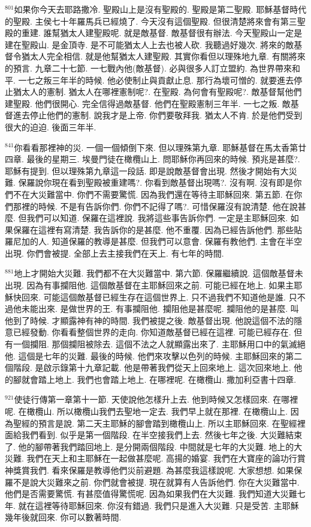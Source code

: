 \documentclass{book}
\begin{document}
$^{801}$如果你今天去耶路撒冷.
聖殿山上是沒有聖殿的.
聖殿是第二聖殿.
耶穌基督時代的聖殿.
主侯七十年羅馬兵已經燒了.
今天沒有這個聖殿.
但很清楚將來會有第三聖殿的重建.
誰幫猶太人建聖殿呢.
就是敵基督.
敵基督很有辦法.
今天聖殿山一定是建在聖殿山.
是金頂寺.
是不可能猶太人上去也被人砍.
我聽過好幾次.
將來的敵基督令猶太人完全相信.
就是他幫猶太人建聖殿.
其實你看但以理殊地九章.
有關將來的預言.
九章二十七節.
一七戰內他(敵基督).
必與很多人訂立盟約.
為世界帶來和平.
一七之叛三年半的時候.
他必使制止與貢獻止息.
那行為壞可憎的.
就要進去停止猶太人的憲制.
猶太人在哪裡憲制呢?.
在聖殿.
為何會有聖殿呢?.
敵基督幫他們建聖殿.
他們很開心.
完全信得過敵基督.
他們在聖殿憲制三年半.
一七之叛.
敵基督進去停止他們的憲制.
說我才是上帝.
你們要敬拜我.
猶太人不肯.
於是他們受到很大的迫迫.
後面三年半.

$^{841}$你看看那裡神的災.
一個一個傾倒下來.
但以理殊第九章.
耶穌基督在馬太香第廿四章.
最後的星期三.
埃曼門徒在橄欖山上.
問耶穌你再回來的時候.
預兆是甚麼?.
耶穌有提到.
但以理殊第九章這一段話.
即是說敵基督會出現.
然後才開始有大災難.
保羅說你現在看到聖殿被重建嗎?.
你看到敵基督出現嗎?.
沒有啊.
沒有即是你們不在大災難當中.
你們不需要驚慌.
因為我們還在等待主耶穌回來.
第五節.
在你們那裡的時候.
不是有告訴你們.
你們不記得了嗎?.
可惜保羅沒有說清楚.
他在說甚麼.
但我們可以知道.
保羅在這裡說.
我將這些事告訴你們.
一定是主耶穌回來.
如果保羅在這裡有寫清楚.
我告訴你的是甚麼.
他不重覆.
因為已經告訴他們.
那些貼羅尼加的人.
知道保羅的教導是甚麼.
但我們可以意會.
保羅有教他們.
主會在半空出現.
你們會被提.
全部上去主接我們在天上.
有七年的時間.

$^{881}$地上才開始大災難.
我們都不在大災難當中.
第六節.
保羅繼續說.
這個敵基督未出現.
因為有事攔阻他.
這個敵基督在主耶穌回來之前.
可能已經在地上.
如果主耶穌快回來.
可能這個敵基督已經生存在這個世界上.
只不過我們不知道他是誰.
只不過他未能出來.
是做世界的王.
有事攔阻他.
攔阻他是甚麼呢.
攔阻他的是甚麼.
叫他到了時候.
才顯露神有神的時間.
我們被提之後.
敵基督出現.
他說這個不法的隱意已經發動.
你看看整個世界的走向.
你知道敵基督已經在這裡.
可能已經存在.
但有一個攔阻.
那個攔阻被除去.
這個不法之人就顯露出來了.
主耶穌用口中的氣滅絕他.
這個是七年的災難.
最後的時候.
他們來攻擊以色列的時候.
主耶穌回來的第二個階段.
是啟示錄第十九章記載.
他是帶著我們從天上回來地上.
這次回來地上.
他的腳就會踏上地上.
我們也會踏上地上.
在哪裡呢.
在橄欖山.
撒加利亞書十四章.

$^{921}$使徒行傳第一章第十一節.
天使說他怎樣升上去.
他到時候又怎樣回來.
在哪裡呢.
在橄欖山.
所以橄欖山我們去聖地一定去.
我們早上就在那裡.
在橄欖山上.
因為聖經的預言是說.
第二天主耶穌的腳會踏到橄欖山上.
所以主耶穌回來.
在聖經裡面給我們看到.
似乎是第一個階段.
在半空接我們上去.
然後七年之後.
大災難結束了.
他的腳帶著我們踏回地上.
是分開兩個階段.
中間就是七年的大災難.
地上的大災難.
我們在天上和主耶穌在一起做甚麼呢.
高揚的婚宴.
我們在大寶座的論功行賞神獎賞我們.
看來保羅是教導他們災前避題.
為甚麼我這樣說呢.
大家想想.
如果保羅不是說大災難來之前.
你們就會被提.
現在就算有人告訴他們.
你在大災難當中.
他們是否需要驚慌.
有甚麼值得驚慌呢.
因為如果我們在大災難.
我們知道大災難七年.
就在這裡等待耶穌回來.
你沒有錯過.
我們只是進入大災難.
只是受苦.
主耶穌幾年後就回來.
你可以數著時間.
\end{document}
